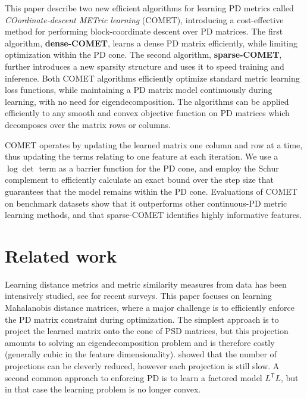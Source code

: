 \documentclass[twoside,11pt]{article}
\newcommand\mat[1]{{#1}}
\newcommand{\T}{{}^\mathsf{T}}
\newcommand{\cholL}{\mat{L}}
\begin{document}
This paper describe two new efficient algorithms for learning PD metrics called {\em{COordinate-descent METric learning}} (COMET), introducing a cost-effective method for performing block-coordinate descent over PD  matrices. The first algorithm, {\bf dense-COMET}, learns a dense PD matrix efficiently, while limiting optimization within the PD cone. The second algorithm, {\bf sparse-COMET}, further introduces a new sparsity structure and uses it to speed training and inference. Both COMET algorithms efficiently optimize standard metric learning loss functions, while maintaining a PD matrix model continuously during learning, with no need for eigendecomposition. The algorithms can be applied efficiently to any smooth and convex objective function on PD matrices which decomposes over the matrix rows or columns.

COMET operates by updating the learned matrix one column and row at a time, thus updating the terms relating to one feature at each iteration. We use a $\log \det$ term as a barrier function for the PD cone, and employ the Schur complement to efficiently calculate an exact bound over the step size that guarantees that the model remains within the PD cone. Evaluations of COMET on benchmark datasets show that it outperforms other continuous-PD metric learning methods, and that sparse-COMET identifies highly informative features. 
\vspace{-6pt}
\section{Related work}
\vskip -5pt
Learning distance metrics and metric similarity measures from data has been intensively studied, see \citet{bellet2013survey, kulis2012survey} for recent surveys. This paper focuses on learning Mahalanobis distance matrices, where a major challenge  is to efficiently enforce the PD matrix constraint during optimization. The simplest approach is to project the learned matrix onto the cone of PSD matrices, but this projection amounts to solving an eigendecomposition problem and is therefore costly (generally cubic in the feature dimensionality).  \citet{qian, qianHD} showed that the number of projections can be cleverly reduced, however each projection is still slow. A second common approach to enforcing PD is to learn a factored model $\cholL\T \cholL$, but in that case the learning problem is no longer convex. 
\end{document}
